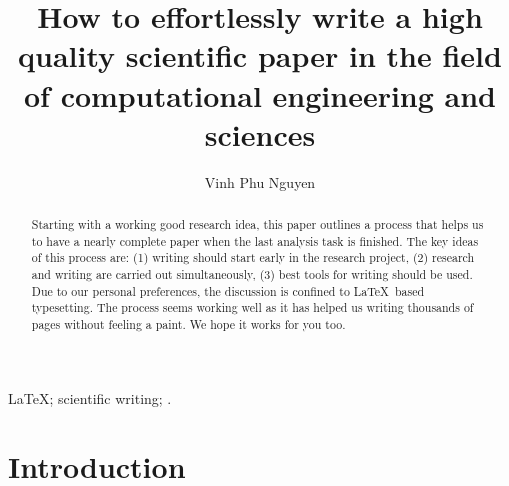 \documentclass[authoryear,3p,times,preprint,review,fleqn]{elsarticle}
\numberwithin{equation}{section}
\theoremstyle{remark}
\begin{document}
\begin{frontmatter}



\title{\textbf{How to effortlessly write a high quality scientific paper in the field of computational engineering and sciences }}



\author[1]{Vinh Phu Nguyen}



\address[1]{Department of Civil Engineering, Monash University, Clayton 3800, VIC, Australia}



\begin{abstract}
Starting with a working good research idea, this paper outlines a process that helps us to have a nearly complete paper when the last analysis task is finished.  The key ideas of this process are: (1) writing should start early in the research project, (2) research and writing are carried out simultaneously, (3) best tools for writing should be used.   Due to our personal preferences, the discussion is confined to \LaTeX\ based typesetting. The process seems working well as it has helped us writing thousands of pages without feeling a paint. We hope it works for you too. 

\end{abstract}


\begin{keyword}
 \LaTeX; scientific writing; .
\end{keyword}


\end{frontmatter}



\section{Introduction}

\showthe\textwidth %
\end{document}
